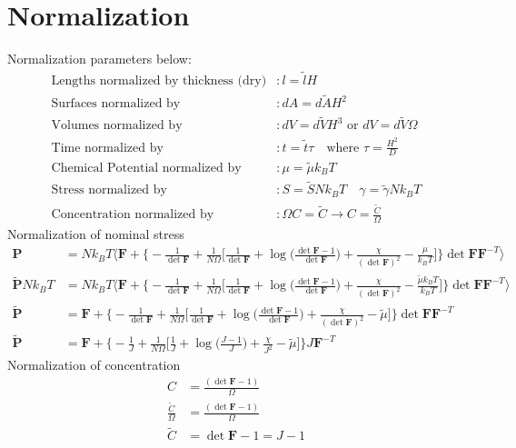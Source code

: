 \documentclass[12pt,3p]{article}
\numberwithin{equation}{section}
\begin{document}
\section{Normalization}
Normalization parameters below:
\begin{align*}
\text{Lengths normalized by thickness (dry)}&: l = \tilde{l} H \\
\text{Surfaces normalized by}&: dA = d \tilde{A} H^2 \\
\text{Volumes normalized by}&: dV = d \tilde{V} H^3 \text{ or } dV = d \tilde{V} \Omega \\ 
\text{Time normalized by}&: t = \tilde{t} \tau \quad \text{where } \tau = \frac{H^2}{D} \\
\text{Chemical Potential normalized by}&: \mu = \tilde{\mu} k_B T \\
\text{Stress normalized by}&: S= \tilde{S} N k_B T \quad \gamma = \tilde{\gamma} N k_B T \\
\text{Concentration normalized by}&: \Omega C = \tilde{C} \rightarrow C = \frac{\tilde{C}}{\Omega} 
\end{align*}
Normalization of nominal stress
\begin{align*}
\mathbf{P} &= N k_B T \bigg \langle \mathbf{F} + \bigg\{- \frac{1}{\det \mathbf{F}} + \frac{1}{N \Omega} \bigg[ \frac{1}{\det \mathbf{F}} + \log \bigg( \frac{\det \mathbf{F} - 1}{\det \mathbf{F}} \bigg) + \frac{\chi}{(\det \mathbf{F})^2} - \frac{\mu}{k_B T} \bigg] \bigg\} \det \mathbf{F} \mathbf{F}^{-T}\bigg \rangle \\
\mathbf{\tilde{P}} N k_B T &= N k_B T \bigg \langle \mathbf{F} + \bigg\{- \frac{1}{\det \mathbf{F}} + \frac{1}{N \Omega} \bigg[ \frac{1}{\det \mathbf{F}} + \log \bigg( \frac{\det \mathbf{F} - 1}{\det \mathbf{F}} \bigg) + \frac{\chi}{(\det \mathbf{F})^2} - \frac{\tilde{\mu} k_B T}{k_B T} \bigg] \bigg\} \det \mathbf{F} \mathbf{F}^{-T}\bigg \rangle \\
\mathbf{\tilde{P}} &= \mathbf{F} + \bigg\{- \frac{1}{\det \mathbf{F}} + \frac{1}{N \Omega} \bigg[ \frac{1}{\det \mathbf{F}} + \log \bigg( \frac{\det \mathbf{F} - 1}{\det \mathbf{F}} \bigg) + \frac{\chi}{(\det \mathbf{F})^2} - \tilde{\mu} \bigg] \bigg\} \det \mathbf{F} \mathbf{F}^{-T} \\
\mathbf{\tilde{P}} &= \mathbf{F} + \bigg\{- \frac{1}{J} + \frac{1}{N \Omega} \bigg[ \frac{1}{J} + \log \bigg( \frac{J - 1}{J} \bigg) + \frac{\chi}{J^2} - \tilde{\mu} \bigg] \bigg\} J \mathbf{F}^{-T}
\end{align*}
Normalization of concentration
\begin{align*}
C &= \frac{(\det \mathbf{F} - 1)}{\Omega} \\
\frac{\tilde{C}}{\Omega} &= \frac{(\det \mathbf{F} - 1)}{\Omega} \\
\tilde{C} &= \det \mathbf{F} - 1 = J - 1
\end{align*}
\end{document}
